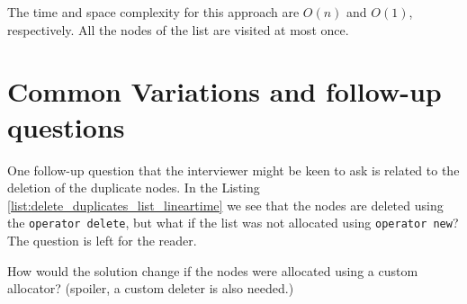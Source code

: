 The time and space complexity for this approach are $O(n)$ and $O(1)$, respectively. All the nodes of the list are  visited at most once.




\section{Common Variations and follow-up questions}
One follow-up question that the interviewer might be keen to ask is related to the deletion of the duplicate nodes. In the Listing \ref{list:delete_duplicates_list_lineartime} we see that the nodes are deleted using the \lstinline[columns=fixed]{operator delete}, but what if the list was not allocated using \lstinline[columns=fixed]{operator new}? The question is left for the reader.

\begin{exercise}
How would the solution change if the nodes were allocated using a custom allocator? (spoiler, a custom deleter is also needed.)
\end{exercise}
